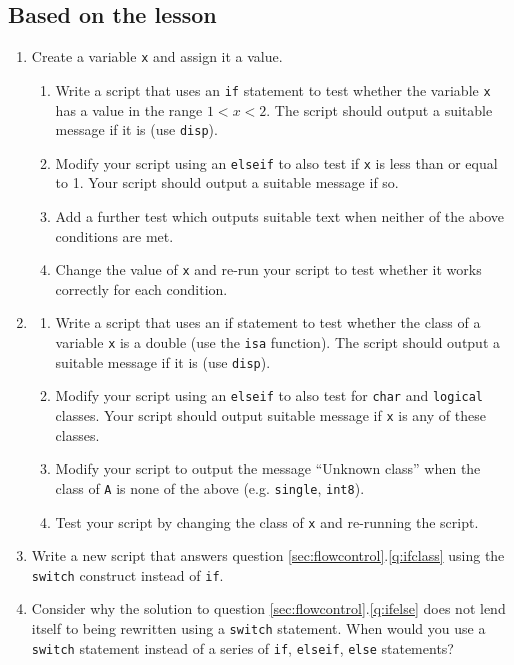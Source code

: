 \documentclass{article}
\begin{document}
	\subsection*{Based on the lesson}
	\begin{enumerate}
		\item Create a variable \texttt{x} and assign it a value.
		\label{q:ifelse}
		\begin{enumerate}
			\item Write a script that uses an \texttt{if} statement to test whether the variable \texttt{x} has a value in the range $1<x<2$. The script should output a suitable message if it is (use \texttt{disp}).
			\item Modify your script using an \texttt{elseif} to also test if \texttt{x} is less than or equal to 1. Your script should output a suitable message if so.
			\item Add a further test which outputs suitable text when neither of the above conditions are met.
			\item Change the value of \texttt{x} and re-run your script to test whether it works correctly for each condition.
		\end{enumerate}
		\item 
		\label{q:ifclass}
		\begin{enumerate}
			\item Write a script that uses an if statement to test whether the class of a variable \texttt{x} is a double (use the \texttt{isa} function). The script should output a suitable message if it is (use \texttt{disp}).
			\item Modify your script using an \texttt{elseif} to also test for \texttt{char} and \texttt{logical} classes. Your script should output suitable message if \texttt{x} is any of these classes.
			\item Modify your script to output the message ``Unknown class'' when the class of \texttt{A} is none of the above (e.g. \texttt{single}, \texttt{int8}).
			\item Test your script by changing the class of \texttt{x} and re-running the script.
		\end{enumerate}
		\item Write a new script that answers question \ref{sec:flowcontrol}.\ref{q:ifclass} using the \texttt{switch} construct instead of \texttt{if}.
		\item Consider why the solution to question \ref{sec:flowcontrol}.\ref{q:ifelse} does not lend itself to being rewritten using a \texttt{switch} statement. When would you use a \texttt{switch} statement instead of a series of \texttt{if}, \texttt{elseif}, \texttt{else} statements?

\end{enumerate}
\end{document}
